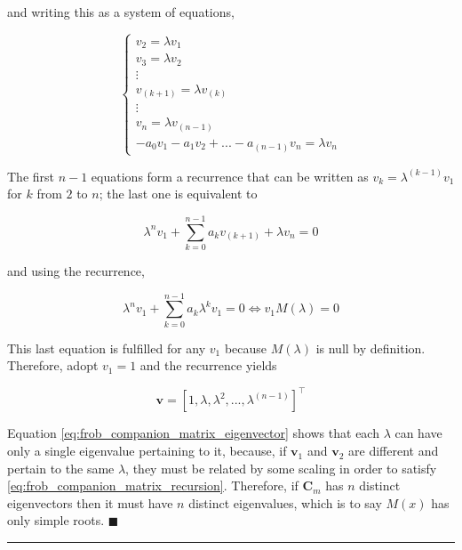 	and writing this as a system of equations,

\begin{equation}
\left\{\begin{array}{c}
	v_2 = \lambda v_1 \\[3mm]
	v_3 = \lambda v_2 \\[3mm]
	\vdots \\[3mm]
	v_{(k+1)} = \lambda v_{(k)} \\[3mm]
	\vdots \\[3mm]
	v_{n} = \lambda v_{(n-1)} \\[3mm]
	-a_0v_1 -a_1v_2 + ... - a_{(n-1)}v_n = \lambda v_n
\end{array}\right. \label{eq:frob_companion_matrix_recursion}
\end{equation}

	The first $n-1$ equations form a recurrence that can be written as $v_k = \lambda^{(k-1)} v_1$ for $k$ from $2$ to $n$; the last one is equivalent to

\begin{equation} \lambda^n v_1 + \sum\limits_{k=0}^{n-1} a_k v_{(k+1)} + \lambda v_n = 0 \end{equation}

	and using the recurrence,

\begin{equation} \lambda^n v_1 + \sum\limits_{k=0}^{n-1} a_k \lambda^k v_1 = 0 \Leftrightarrow v_1 M\left(\lambda\right) = 0 \end{equation}

	This last equation is fulfilled for any $v_1$ because $M\left(\lambda\right)$ is null by definition. Therefore, adopt $v_1 = 1$ and the recurrence yields

\begin{equation} \mathbf{v} = \left[1,\lambda,\lambda^2,...,\lambda^{(n-1)}\right]^\intercal \label{eq:frob_companion_matrix_eigenvector} \end{equation}

	Equation \eqref{eq:frob_companion_matrix_eigenvector} shows that each $\lambda$ can have only a single eigenvalue pertaining to it, because, if $\mathbf{v}_1$ and $\mathbf{v}_2$ are different and pertain to the same $\lambda$, they must be related by some scaling in order to satisfy \eqref{eq:frob_companion_matrix_recursion}. Therefore, if $\mathbf{C}_m$ has $n$ distinct eigenvectors then it must have $n$ distinct eigenvalues, which is to say $M(x)$ has only simple roots.
\hfill$\blacksquare$
\vspace{5mm}
\hrule
\vspace{5mm} %

